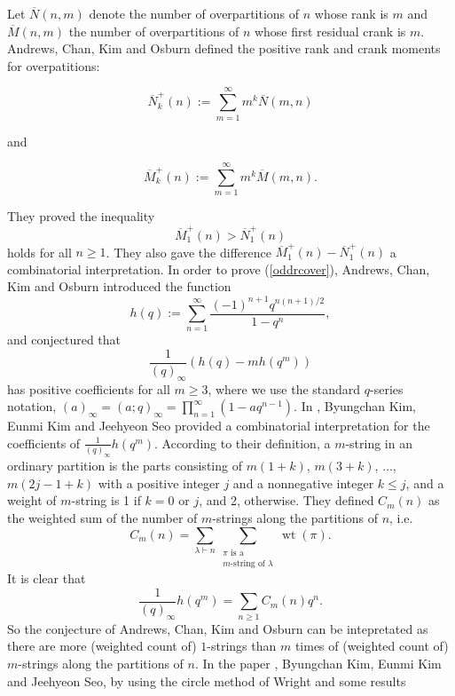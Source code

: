 \documentclass[11pt,reqno]{amsart}
\theoremstyle{definition}
\newcommand{\la}{\lambda}
\numberwithin{equation}{section}
\begin{document}
Let $\overline{N}(n,m)$ denote the number of overpartitions of $n$ whose rank is $m$ and $\overline{M}(n,m)$ the number of overpartitions of $n$ whose first residual crank is $m$. Andrews, Chan, Kim and Osburn \cite{acko} defined the positive rank and crank moments for overpatitions: 

\begin{equation*}
\overline{N}_{k}^{+}(n) := \sum_{m=1}^{\infty} m^{k} \overline{N}(m,n)
\end{equation*}

\noindent and

\begin{equation*}
\overline{M}_{k}^{+}(n) := \sum_{m=1}^{\infty} m^{k} \overline{M}(m,n).
\end{equation*}

\noindent They proved the inequality
\begin{equation} \label{oddrcover}
\overline{M}_{1}^{+}(n) > \overline{N}_{1}^{+}(n)
\end{equation}
holds for all $n \geq 1$. They also gave the difference 
$ \overline{M}_{1}^{+}(n) - \overline{N}_{1}^{+}(n)$ a combinatorial interpretation. In order to prove (\ref{oddrcover}),  Andrews, Chan, Kim and Osburn \cite{acko} introduced the function
\begin{equation*} \label{hqdefn}
 h(q) := \sum_{n=1}^{\infty} \frac{(-1)^{n+1} q^{n(n+1)/2}}{1-q^n}, 
 \end{equation*}
 and conjectured that
$$\label{con}
 \frac{1}{(q)_{\infty}} ( h(q) - m h(q^m) )
$$
 has positive coefficients for all $m\geq 3$, where we use the standard $q$-series notation, $(a)_{\infty} = (a;q)_{\infty} = \prod_{n=1}^{\infty} (1-aq^{n-1} ).$  In \cite{kks}, Byungchan Kim, Eunmi Kim and Jeehyeon Seo provided a combinatorial interpretation for the coefficients of $ \frac{1}{(q)_{\infty}} h( q^m )$. According to their definition, a $m$-string in an ordinary partition is the parts consisting of $m(1+k)$, $m(3+k)$,  $\ldots$, $m(2j-1+k)$ with a positive integer $j$ and a nonnegative integer $k \le j$, and a weight of $m$-string is 1 if $k=0$ or $j$, and 2, otherwise. They defined $C_m (n)$ as the weighted sum of the number of $m$-strings along the partitions of $n$, i.e.
$$
 C_m (n) = \sum_{\la \vdash n} \sum_{\substack{\text{$\pi$ is a} \\ \text{$m$-string of $\la$}}} \operatorname{wt} (\pi).
$$
It is clear that
$$
 \frac{1}{(q)_{\infty}} h(q^m) = \sum_{n \ge 1} C_m (n) q^n.
$$
So the conjecture of Andrews, Chan, Kim and Osburn \cite{acko} can be intepretated as there are more (weighted count of) $1$-strings than $m$ times of (weighted count of) $m$-strings along the partitions of $n$. In the paper \cite{kks}, Byungchan Kim, Eunmi Kim and Jeehyeon Seo, by using the circle method of Wright \cite{w} and some results
\end{document}
